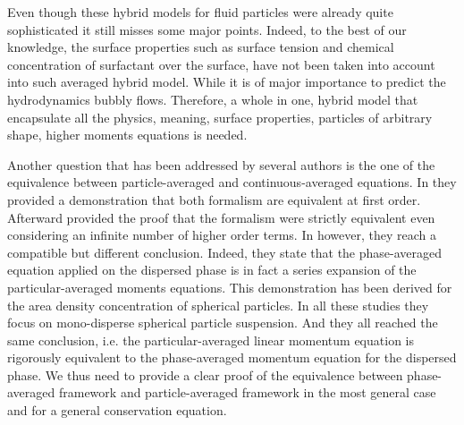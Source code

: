 Even though these hybrid models for fluid particles were already quite sophisticated it still misses some major points. 
Indeed, to the best of our knowledge, the surface properties such as surface tension and chemical concentration of surfactant over the surface, have not been taken into account into such averaged hybrid model. 
While it is of major importance to predict the hydrodynamics bubbly flows. 
Therefore, a whole in one, hybrid model that encapsulate all the physics, meaning, surface properties, particles of arbitrary shape, higher moments equations is needed. 


Another question that has been addressed by several authors \citep{nott2011suspension,zhang1997momentum} is the one of the equivalence between particle-averaged and continuous-averaged equations. 
In \citet[Appendix A]{zhang1997momentum} they provided a demonstration that both formalism are equivalent at first order. 
Afterward \citet[Appendix A]{nott2011suspension} provided the proof that the formalism were strictly equivalent even considering an infinite number of higher order terms. 
In \citet{lhuillier2010multiphase} however, they reach a compatible but different conclusion. 
Indeed, they state that the phase-averaged equation applied on the dispersed phase is in fact a series expansion of the particular-averaged moments equations. 
This demonstration has been derived for the area density concentration of spherical particles. 
In all these studies they focus on mono-disperse spherical particle suspension. 
And they all reached the same conclusion, i.e. the particular-averaged linear momentum equation is rigorously equivalent to the phase-averaged momentum equation for the dispersed phase. 
We thus need to provide a clear proof of the equivalence between phase-averaged framework and particle-averaged framework in the most general case and for a general conservation equation. 


